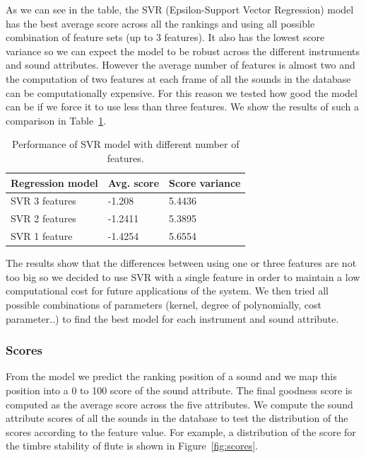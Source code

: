 \documentclass{article}
\begin{document}
As we can see in the table, the SVR (Epsilon-Support Vector Regression) model has the best average score across all the rankings and using all possible combination of feature sets (up to 3 features). It also has the lowest score variance so we can expect the model to be robust across the different instruments and sound attributes. However the average number of features is almost two and the computation of two features at each frame of all the sounds in the database can be computationally expensive. For this reason we tested how good the model can be if we force it to use less than three features. We show the results of such a comparison in Table~\ref{svr}.

\begin{table}[]
\centering
\label{my-label}
\begin{tabular}{lll}
\hline
Regression model & Avg. score & Score variance \\ \hline
SVR 3 features   & -1.208     & 5.4436         \\
SVR 2 features   & -1.2411    & 5.3895         \\
SVR 1 feature    & -1.4254    & 5.6554         \\ \hline
\end{tabular}
\caption{Performance of SVR model with different number of features.}
\label{svr}
\end{table}

The results show that the differences between using one or three features are not too big so we decided to use SVR with a single feature  in order to maintain a low computational cost for future applications of the system. We then tried all possible combinations of parameters (kernel, degree of polynomially, cost parameter..) to find the best model for each instrument and sound attribute.

\subsubsection{Scores}
From the model we predict the ranking position of a sound and we map this position into a 0 to 100 score of the sound attribute. The final goodness score is computed as the average score across the five attributes. We compute the sound attribute scores of all the sounds in the database to test the distribution of the scores according to the feature value. For example, a distribution of the score for the timbre stability of flute is shown in Figure~\ref{fig:scores}.
\end{document}
